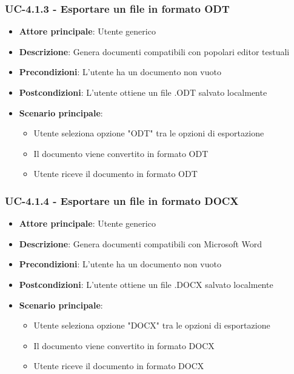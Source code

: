 \documentclass[11pt,a4paper]{article}
\begin{document}
\subsubsection{UC-4.1.3 - Esportare un file in formato ODT}
\begin{itemize}
    \item \textbf{Attore principale}: Utente generico
    \item \textbf{Descrizione}: Genera documenti compatibili con popolari editor testuali
    \item \textbf{Precondizioni}: L'utente ha un documento non vuoto
    \item \textbf{Postcondizioni}: L'utente ottiene un file .ODT salvato localmente
    \item \textbf{Scenario principale}:
        \begin{itemize}
            \item Utente seleziona opzione "ODT" tra le opzioni di esportazione
            \item Il documento viene convertito in formato ODT
            \item Utente riceve il documento in formato ODT
        \end{itemize}
\end{itemize}

\subsubsection{UC-4.1.4 - Esportare un file in formato DOCX}
\begin{itemize}
    \item \textbf{Attore principale}: Utente generico
    \item \textbf{Descrizione}: Genera documenti compatibili con Microsoft Word
    \item \textbf{Precondizioni}: L'utente ha un documento non vuoto
    \item \textbf{Postcondizioni}: L'utente ottiene un file .DOCX salvato localmente
    \item \textbf{Scenario principale}:
        \begin{itemize}
            \item Utente seleziona opzione "DOCX" tra le opzioni di esportazione
            \item Il documento viene convertito in formato DOCX
            \item Utente riceve il documento in formato DOCX
        \end{itemize}
\end{itemize}
\end{document}

